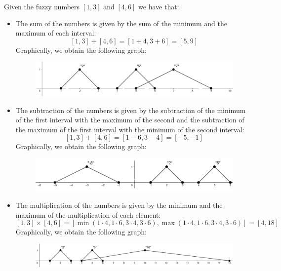 \documentclass[12pt, a4paper]{report}
\newtheorem[style=M,bodystyle=\normalfont]{theorem}{Theorem}
\newtheorem[style=M,bodystyle=\normalfont]{corollary}{Corollary}
\newtheorem[style=M,bodystyle=\normalfont]{lemma}{Lemma}
\newtheorem[style=M,bodystyle=\normalfont]{definition}{Definition}
\begin{document}
    \begin{example}
        Given the fuzzy numbers $[1,3]$ and $[4,6]$ we have that:
        \begin{itemize}
            \item The sum of the numbers is given by the sum of the minimum and the maximum of each interval:
                \[[1,3]+[4,6]=[1+4,3+6]=[5,9]\]
                Graphically, we obtain the following graph:
                \begin{figure}[H]
                    \centering
                    \includegraphics[width=0.75\linewidth]{images/sum.png}
                \end{figure}
            \item The subtraction of the numbers is given by the subtraction of the minimum of the first interval with the maximum of the 
            second and the subtraction of the maximum of the first interval with the minimum of the second interval:
                \[[1,3]+[4,6]=[1-6,3-4]=[-5,-1]\]
                Graphically, we obtain the following graph:
                \begin{figure}[H]
                    \centering
                    \includegraphics[width=0.75\linewidth]{images/subtraction.png}
                \end{figure}
            \item The multiplication of the numbers is given by the minimum and the maximum of the multiplication of each element:
                \[[1,3] \times [4,6]=[\min(1 \cdot 4, 1 \cdot 6, 3 \cdot 4, 3 \cdot 6),\max(1 \cdot 4, 1 \cdot 6, 3 \cdot 4, 3 \cdot 6)]=[4,18]\]                Graphically, we obtain the following graph:
                \begin{figure}[H]
                    \centering
                    \includegraphics[width=0.75\linewidth]{images/multiplication.png}
                \end{figure}

\end{itemize}
\end{example}
\end{document}
